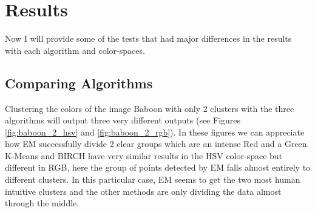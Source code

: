 \documentclass[sigconf,authorversion]{acmart}
\begin{document}
\section{Results}
Now I will provide some of the tests that had major differences in the results with each algorithm and color-spaces.
\subsection{Comparing Algorithms}
Clustering the colors of the image Baboon with only 2 clusters with the three algorithms will output three very different outputs (see Figures \ref{fig:baboon_2_hsv} and \ref{fig:baboon_2_rgb}). In these figures we can appreciate how EM successfully divide 2 clear groups which are an intense Red and a Green. K-Means and BIRCH have very similar results in the HSV color-space but different in RGB, here the group of points detected by EM falls almost entirely to different clusters. In this particular case, EM seems to get the two most human intuitive clusters and the other methods are only dividing the data almost through the middle.
\end{document}
